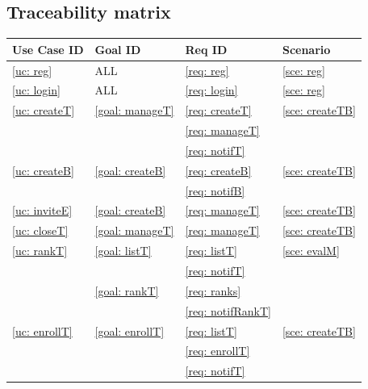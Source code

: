     \subsection{Traceability matrix}
    \begin{table}[h]
	    \centering
            \renewcommand{\arraystretch}{1.5}
            \begin{tabular}{|m{3cm}|m{3cm}|m{3cm}|m{3cm}|}
                \hline
                \textbf{Use Case ID} & \textbf{Goal ID} & \textbf{Req ID} & \textbf{Scenario} \\
                \hline
                \ref{uc: reg} & ALL & \ref{req: reg} & \ref{sce: reg}  \\
                \hline
                \ref{uc: login} & ALL & \ref{req: login} & \ref{sce: reg}   \\
                \hline
                \ref{uc: createT} & \ref{goal: manageT} & \ref{req: createT} & \ref{sce: createTB}   \\
                \null & \null  & \ref{req: manageT}&\null \\
                \null & \null  & \ref{req: notifT}&\null \\
                \hline
                \ref{uc: createB} & \ref{goal: createB} & \ref{req: createB} & \ref{sce: createTB}  \\
                \null & \null  & \ref{req: notifB}&\null \\
                \hline
                \ref{uc: inviteE} & \ref{goal: createB} & \ref{req: manageT} & \ref{sce: createTB}  \\
                \hline
                \ref{uc: closeT} & \ref{goal: manageT} & \ref{req: manageT} & \ref{sce: createTB}  \\
                \hline
                \ref{uc: rankT} & \ref{goal: listT} & \ref{req: listT} & \ref{sce: evalM}  \\
                \null & \null  & \ref{req: notifT}&\null \\
                \null & \ref{goal: rankT}  & \ref{req: ranks}&\null \\
                \null & \null  & \ref{req: notifRankT}&\null \\
                \hline
                \ref{uc: enrollT} & \ref{goal: enrollT} & \ref{req: listT} & \ref{sce: createTB}  \\
                \null & \null  & \ref{req: enrollT}&\null \\
                \null & \null  & \ref{req: notifT}&\null \\

\end{tabular}
\end{table}
